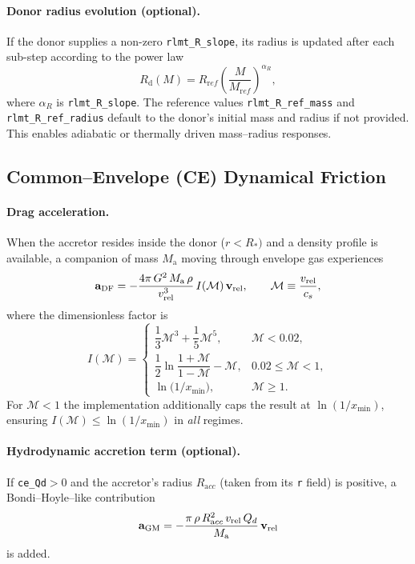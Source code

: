 \documentclass[11pt]{article}
\begin{document}
\paragraph{Donor radius evolution (optional).}
If the donor supplies a non-zero \texttt{rlmt\_R\_slope}, its radius is updated
after each sub-step according to the power law
\[
R_{\mathrm d}(M)=R_{\mathrm ref}
\left(\frac{M}{M_{\mathrm ref}}\right)^{\alpha_R},
\]
where $\alpha_R$ is \texttt{rlmt\_R\_slope}. The reference values
\texttt{rlmt\_R\_ref\_mass} and \texttt{rlmt\_R\_ref\_radius} default to the
donor's initial mass and radius if not provided. This enables adiabatic or
thermally driven mass–radius responses.

\subsection{Common–Envelope (CE) Dynamical Friction}
\label{sec:ce_drag}

\paragraph{Drag acceleration.}
When the accretor resides inside the donor ($r<R_*)$ and a density profile is
available, a companion of mass $M_{\mathrm a}$ moving through envelope gas
experiences
\[
\mathbf a_{\rm DF}=
-\frac{4\pi\,G^2\,M_{\mathrm a}\,\rho}{v_{\rm rel}^3}\,
   I(\mathcal M)\,\mathbf v_{\rm rel},
\qquad
\mathcal M\equiv\frac{v_{\rm rel}}{c_s},
\]
where the dimensionless factor is
\begin{equation}
I(\mathcal M)=
\begin{cases}
\dfrac{1}{3}\mathcal M^3+\dfrac{1}{5}\mathcal M^5,&\mathcal M<0.02,\\[0.6em]
\dfrac{1}{2}\ln\!\dfrac{1+\mathcal M}{1-\mathcal M}-\mathcal M,
 & 0.02\le\mathcal M<1,\\[0.6em]
\ln\!\bigl(1/x_{\min}\bigr),&\mathcal M\ge1.
\end{cases}
\label{eq:I_prefactor}
\end{equation}
For $\mathcal M<1$ the implementation additionally caps the result at
$\ln(1/x_{\min})$,
ensuring $I(\mathcal M)\le\ln(1/x_{\min})$ in \emph{all} regimes.

\paragraph{Hydrodynamic accretion term (optional).}
If \texttt{ce\_Qd}$>$0 and the accretor's radius $R_{\mathrm acc}$ (taken from its
\texttt{r} field) is positive, a Bondi–Hoyle–like contribution
\[
\mathbf a_{\rm GM}
=-\frac{\pi\,\rho\,R_{\mathrm acc}^2\,v_{\rm rel}\,Q_d}{M_{\mathrm a}}
\,\mathbf v_{\rm rel}
\]
is added.
\end{document}
